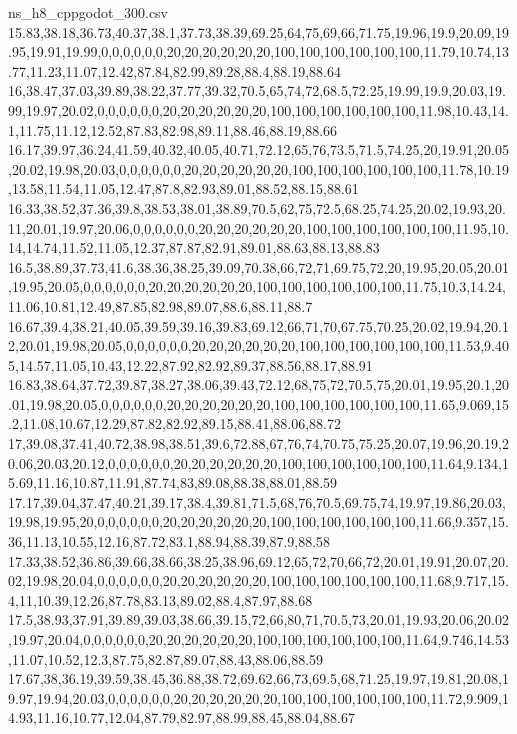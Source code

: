 \begin{filecontents*}[overwrite]{ns_h8_cppgodot_300.csv}
15.83,38.18,36.73,40.37,38.1,37.73,38.39,69.25,64,75,69,66,71.75,19.96,19.9,20.09,19.95,19.91,19.99,0,0,0,0,0,0,20,20,20,20,20,20,100,100,100,100,100,100,11.79,10.74,13.77,11.23,11.07,12.42,87.84,82.99,89.28,88.4,88.19,88.64
16,38.47,37.03,39.89,38.22,37.77,39.32,70.5,65,74,72,68.5,72.25,19.99,19.9,20.03,19.99,19.97,20.02,0,0,0,0,0,0,20,20,20,20,20,20,100,100,100,100,100,100,11.98,10.43,14.1,11.75,11.12,12.52,87.83,82.98,89.11,88.46,88.19,88.66
16.17,39.97,36.24,41.59,40.32,40.05,40.71,72.12,65,76,73.5,71.5,74.25,20,19.91,20.05,20.02,19.98,20.03,0,0,0,0,0,0,20,20,20,20,20,20,100,100,100,100,100,100,11.78,10.19,13.58,11.54,11.05,12.47,87.8,82.93,89.01,88.52,88.15,88.61
16.33,38.52,37.36,39.8,38.53,38.01,38.89,70.5,62,75,72.5,68.25,74.25,20.02,19.93,20.11,20.01,19.97,20.06,0,0,0,0,0,0,20,20,20,20,20,20,100,100,100,100,100,100,11.95,10.14,14.74,11.52,11.05,12.37,87.87,82.91,89.01,88.63,88.13,88.83
16.5,38.89,37.73,41.6,38.36,38.25,39.09,70.38,66,72,71,69.75,72,20,19.95,20.05,20.01,19.95,20.05,0,0,0,0,0,0,20,20,20,20,20,20,100,100,100,100,100,100,11.75,10.3,14.24,11.06,10.81,12.49,87.85,82.98,89.07,88.6,88.11,88.7
16.67,39.4,38.21,40.05,39.59,39.16,39.83,69.12,66,71,70,67.75,70.25,20.02,19.94,20.12,20.01,19.98,20.05,0,0,0,0,0,0,20,20,20,20,20,20,100,100,100,100,100,100,11.53,9.405,14.57,11.05,10.43,12.22,87.92,82.92,89.37,88.56,88.17,88.91
16.83,38.64,37.72,39.87,38.27,38.06,39.43,72.12,68,75,72,70.5,75,20.01,19.95,20.1,20.01,19.98,20.05,0,0,0,0,0,0,20,20,20,20,20,20,100,100,100,100,100,100,11.65,9.069,15.2,11.08,10.67,12.29,87.82,82.92,89.15,88.41,88.06,88.72
17,39.08,37.41,40.72,38.98,38.51,39.6,72.88,67,76,74,70.75,75.25,20.07,19.96,20.19,20.06,20.03,20.12,0,0,0,0,0,0,20,20,20,20,20,20,100,100,100,100,100,100,11.64,9.134,15.69,11.16,10.87,11.91,87.74,83,89.08,88.38,88.01,88.59
17.17,39.04,37.47,40.21,39.17,38.4,39.81,71.5,68,76,70.5,69.75,74,19.97,19.86,20.03,19.98,19.95,20,0,0,0,0,0,0,20,20,20,20,20,20,100,100,100,100,100,100,11.66,9.357,15.36,11.13,10.55,12.16,87.72,83.1,88.94,88.39,87.9,88.58
17.33,38.52,36.86,39.66,38.66,38.25,38.96,69.12,65,72,70,66,72,20.01,19.91,20.07,20.02,19.98,20.04,0,0,0,0,0,0,20,20,20,20,20,20,100,100,100,100,100,100,11.68,9.717,15.4,11,10.39,12.26,87.78,83.13,89.02,88.4,87.97,88.68
17.5,38.93,37.91,39.89,39.03,38.66,39.15,72,66,80,71,70.5,73,20.01,19.93,20.06,20.02,19.97,20.04,0,0,0,0,0,0,20,20,20,20,20,20,100,100,100,100,100,100,11.64,9.746,14.53,11.07,10.52,12.3,87.75,82.87,89.07,88.43,88.06,88.59
17.67,38,36.19,39.59,38.45,36.88,38.72,69.62,66,73,69.5,68,71.25,19.97,19.81,20.08,19.97,19.94,20.03,0,0,0,0,0,0,20,20,20,20,20,20,100,100,100,100,100,100,11.72,9.909,14.93,11.16,10.77,12.04,87.79,82.97,88.99,88.45,88.04,88.67

\end{filecontents*}
